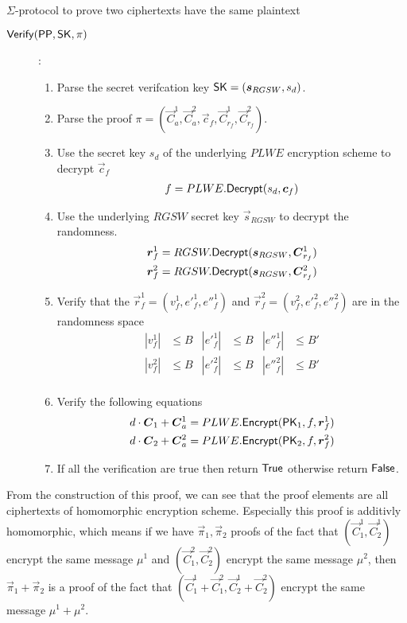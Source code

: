 \begin{section}{$\Sigma$-protocol to prove two ciphertexts have the same plaintext~\label{ProofSamePlaintext}}
\begin{description}
      \item [${\mathsf{Verify}}({\mathsf{PP}}, \mathsf{SK}, \pi)$]:
      \begin{enumerate}
        \item Parse the secret verifcation key $\SK = (\vec{s}_{RGSW}, s_d)$.
        \item Parse the proof $\pi = (\vec{C}^1_a, \vec{C}^2_a, \vec{c}_f, \vec{C}^1_{r_f}, \vec{C}^2_{r_f})$.
        \item Use the secret key $s_d$ of the underlying $PLWE$ encryption scheme to decrypt $\vec{c}_f$
        \begin{align*}
          f &= PLWE.\Dec(s_d, \vec{c}_f)\\
        \end{align*}
        \item Use the underlying $RGSW$ secret key $\vec{s}_{RGSW}$ to decrypt the randomness.
        \begin{align*}
          \vec{r}^1_f &= RGSW.\Dec(\vec{s}_{RGSW}, \vec{C}^1_{r_f})\\
          \vec{r}^2_f &= RGSW.\Dec(\vec{s}_{RGSW}, \vec{C}^2_{r_f})
        \end{align*}
        \item Verify that the $\vec{r}_{f}^1 = (v_{f}^1, e'^{1}_{f}, e''^{1}_{f})$ and $\vec{r}_{f}^2 = (v_{f}^2, e'^2_{f}, e''^2_{f})$ are in the randomness space
        \begin{align*}
          |v_f^1| &\leq B &
          |e'^1_f| &\leq B &
          |e''^1_f| &\leq B'\\
          |v_f^2| &\leq B &
          |e'^2_f| &\leq B &
          |e''^2_f| &\leq B'\\
        \end{align*}
        \item Verify the following equations
        \begin{align*}
          d \cdot \vec{C}_1 + \vec{C}^1_a &= PLWE.\Enc(\PK_1, f, \vec{r}_f^1) \\
          d \cdot \vec{C}_2 + \vec{C}^2_a &= PLWE.\Enc(\PK_2, f, \vec{r}_f^2)
        \end{align*}
        \item If all the verification are true then return $\mathsf{True}$ otherwise return $\mathsf{False}$.
      \end{enumerate}
  \end{description}

  From the construction of this proof, we can see that the proof elements are all
  ciphertexts of homomorphic encryption scheme. Especially this proof is additivly homomorphic,
  which means if we have $\vec{\pi}_1, \vec{\pi}_2$ proofs of the fact that
  $(\vec{C}^1_1, \vec{C}^1_2)$ encrypt the same message $\mu^1$ and
  $(\vec{C}^2_1, \vec{C}^2_2)$ encrypt the same message $\mu^2$,
  then $\vec{\pi}_1 + \vec{\pi}_2$ is a proof of the fact that
  $(\vec{C}^1_1 + \vec{C}^2_1, \vec{C}^1_2+ \vec{C}^2_2)$ encrypt the same message $\mu^1+ \mu^2$.

\end{section}
